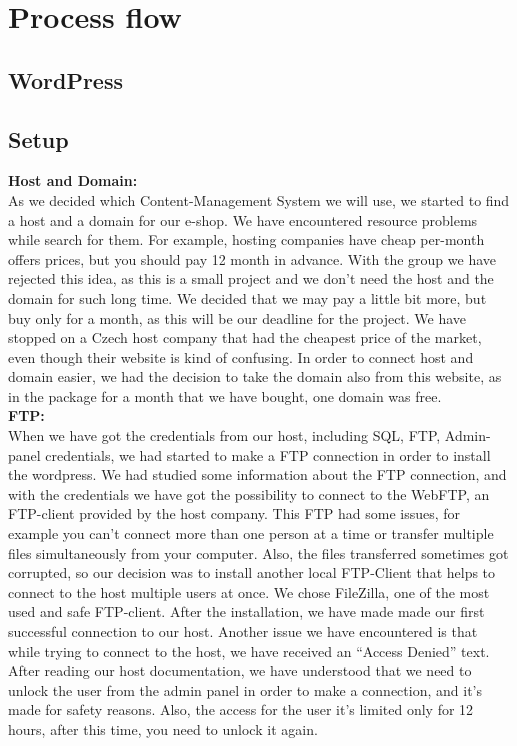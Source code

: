 \documentclass[12p]{article}
\begin{document}
\newpage


\newpage
\section{Process flow}

\subsection{WordPress}

\subsection{Setup}
\textbf{Host and Domain:}
\\
As we decided which Content-Management System we will use, we started to find a host and a domain for our e-shop. We have encountered resource problems while search for them. For example, hosting companies have cheap per-month offers prices, but you should pay 12 month in advance. With the group we have rejected this idea, as this is a small project and we don’t need the host and the domain for such long time. We decided that we may pay a little bit more, but buy only for a month, as this will be our deadline for the project. We have stopped on a Czech host company that had the cheapest price of the market, even though their website is kind of confusing. In order to connect host and domain easier, we had the decision to take the domain also from this website, as in the package for a month that we have  bought, one domain was free. \\

\textbf{FTP:}
\\
When we have got the credentials from our host, including SQL, FTP, Admin-panel credentials, we had started to make a FTP connection in order to install the wordpress. We had studied some information about the FTP connection, and with the credentials we have got the possibility to connect to the WebFTP, an FTP-client provided by the host company. This FTP had some issues, for example you can’t connect more than one person at a time or transfer multiple files simultaneously from your computer. Also, the files transferred sometimes got corrupted, so our decision was to install another local FTP-Client that helps to connect to the host multiple users at once. We chose FileZilla, one of the most used and safe FTP-client. After the installation, we have made made our first successful connection to our host. Another issue we have encountered is that while trying to connect to the host, we have received an “Access Denied” text. After reading our host documentation, we have understood that we need to unlock the user from the admin panel in order to make a connection, and it’s made for safety reasons. Also, the access for the user it’s limited only for 12 hours, after this time, you need to unlock it again. \\
\end{document}
